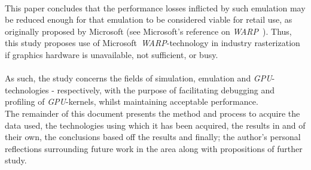 \\
This paper concludes that the performance losses inflicted by such emulation may be reduced enough for that emulation to be considered viable for retail use, as originally proposed by Microsoft (see Microsoft's reference on \textit{WARP}~).
Thus, this study proposes use of Microsoft~\textit{WARP}-technology in industry rasterization if graphics hardware is unavailable, not sufficient, or busy.\\
\\
As such, the study concerns the fields of simulation, emulation and \textit{GPU}-technologies - respectively, with the purpose of facilitating debugging and profiling of \textit{GPU}-kernels, whilst maintaining acceptable performance.\\
The remainder of this document presents the method and process to acquire the data used, the technologies using which it has been acquired, the results in and of their own, the conclusions based off the results and finally; the author's personal reflections surrounding future work in the area along with propositions of further study.

